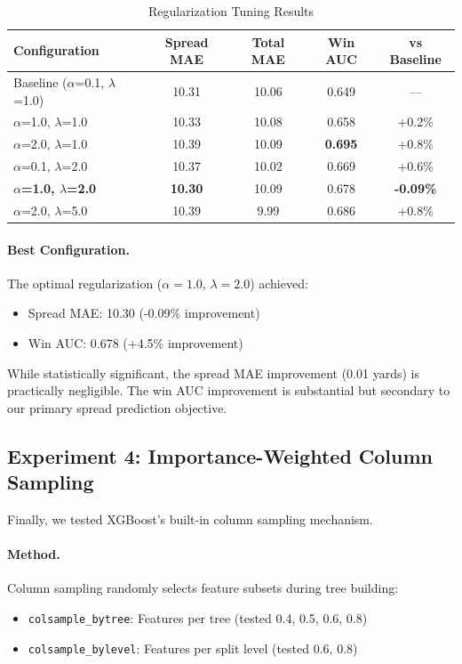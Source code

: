 \begin{table}[htbp]
\centering
\caption{Regularization Tuning Results}
\label{tab:regularization-results}
\small
\begin{tabular}{@{} l S[table-format=2.2] S[table-format=2.2] S[table-format=1.3] c @{}}
\toprule
\textbf{Configuration} & \textbf{Spread MAE} & \textbf{Total MAE} & \textbf{Win AUC} & \textbf{vs Baseline} \\
\midrule
Baseline ($\alpha$=0.1, $\lambda$=1.0) & 10.31 & 10.06 & 0.649 & --- \\
$\alpha$=1.0, $\lambda$=1.0 & 10.33 & 10.08 & 0.658 & +0.2\% \\
$\alpha$=2.0, $\lambda$=1.0 & 10.39 & 10.09 & \textbf{0.695} & +0.8\% \\
$\alpha$=0.1, $\lambda$=2.0 & 10.37 & 10.02 & 0.669 & +0.6\% \\
\textbf{$\alpha$=1.0, $\lambda$=2.0} & \textbf{10.30} & 10.09 & 0.678 & \textbf{-0.09\%} \\
$\alpha$=2.0, $\lambda$=5.0 & 10.39 & 9.99 & 0.686 & +0.8\% \\
\bottomrule
\end{tabular}
\end{table}

\paragraph{Best Configuration.}
The optimal regularization ($\alpha = 1.0$, $\lambda = 2.0$) achieved:
\begin{itemize}[itemsep=2pt,parsep=0pt]
    \item Spread MAE: 10.30 (-0.09\% improvement)
    \item Win AUC: 0.678 (+4.5\% improvement)
\end{itemize}

While statistically significant, the spread MAE improvement (0.01 yards) is practically negligible. The win AUC improvement is substantial but secondary to our primary spread prediction objective.

\subsection{Experiment 4: Importance-Weighted Column Sampling}

Finally, we tested XGBoost's built-in column sampling mechanism.

\paragraph{Method.}
Column sampling randomly selects feature subsets during tree building:
\begin{itemize}[itemsep=2pt,parsep=0pt]
    \item \texttt{colsample\_bytree}: Features per tree (tested 0.4, 0.5, 0.6, 0.8)
    \item \texttt{colsample\_bylevel}: Features per split level (tested 0.6, 0.8)
\end{itemize}

